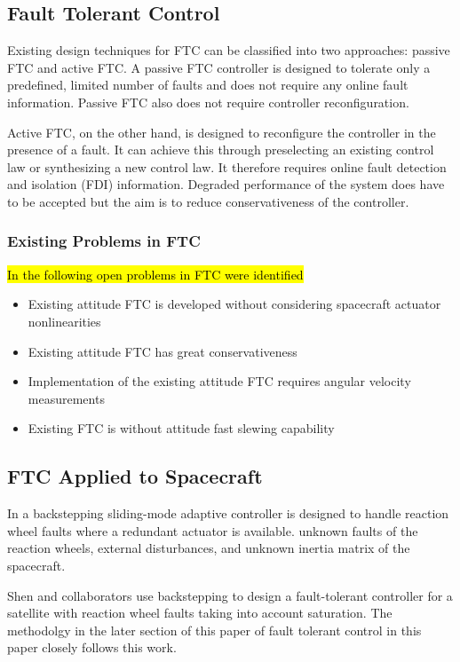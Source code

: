 \subsection{Fault Tolerant Control}
Existing design techniques for FTC can be classified into two approaches: passive FTC and active FTC. A passive FTC controller is designed to tolerate only a predefined, limited number of faults and does not require any online fault information. Passive FTC also does not require controller reconfiguration. \cite{yinReviewRecentDevelopment2016}

Active FTC, on the other hand, is designed to reconfigure the controller in the presence of a fault. It can achieve this through preselecting an existing control law or synthesizing a new control law. It therefore requires online fault detection and isolation (FDI) information. Degraded performance of the system does have to be accepted but the aim is to reduce conservativeness of the controller. \cite{yinReviewRecentDevelopment2016}
\subsubsection{Existing Problems in FTC}
\hl{In \mbox{\cite{yinReviewRecentDevelopment2016}} the following open problems in FTC were identified}
\begin{itemize}
\item Existing attitude FTC is developed without considering spacecraft actuator nonlinearities
\item Existing attitude FTC has great conservativeness
\item Implementation of the existing attitude FTC requires angular velocity measurements
\item Existing FTC is without attitude fast slewing capability
\end{itemize}

\subsection{FTC Applied to Spacecraft}
In \cite{jiangAdaptiveBacksteppingFaulttolerant2010} a backstepping sliding-mode adaptive controller is designed to handle reaction wheel faults where a redundant actuator is available. unknown faults of the reaction wheels, external disturbances, and unknown inertia matrix of the spacecraft. 

Shen and collaborators \cite{shenActiveFaulttolerantControl2019} use backstepping to design a fault-tolerant controller for a satellite with reaction wheel faults taking into account saturation. The methodolgy in the later section of this paper of fault tolerant control in this paper closely follows this work.


